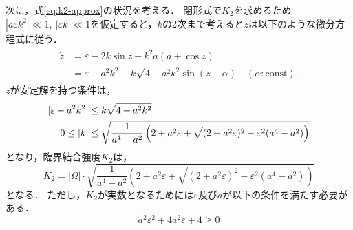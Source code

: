 \documentclass[../main]{subfiles}
\begin{document}
    次に，式\eqref{eq:k2-approx}の状況を考える．
    閉形式で$K_2$を求めるため$|a\varepsilon k^2| \ll 1,\ |\varepsilon k|\ll 1$を仮定すると，$k$の2次まで考えると$z$は以下のような微分方程式に従う．
    \begin{align}
        \label{eq:z-k2-approx}
        \begin{split}
            \dot{z}&=\varepsilon-2k\sin z-k^2a(a+\cos  z)\\
            &=\varepsilon-a^2k^2-k\sqrt{4+a^2k^2}\sin ( z-\alpha)\quad(\alpha:\mathrm{const}).
        \end{split}
    \end{align}
    $z$が安定解を持つ条件は，
    \begin{align}
        |\varepsilon-a^2k^2|&\leq k\sqrt{4+a^2k^2}\notag\\
        0\leq |k|&\leq \sqrt{\frac{1}{a^4-a^2}\left(2+a^2\varepsilon+\sqrt{(2+a^2\varepsilon)^2-\varepsilon^2(a^4-a^2)}\right)}
    \end{align}
    となり，臨界結合強度$K_2$は，
    \begin{equation}
        \label{eq:K2-approx}
        K_2=|\Omega|\cdot\sqrt{\frac{1}{a^4-a^2}\left(2+a^2\varepsilon+\sqrt{(2+a^2\varepsilon)^2-\varepsilon^2(a^4-a^2)}\right)}
    \end{equation}
    となる．
    ただし，$K_2$が実数となるためには$\varepsilon$及び$a$が以下の条件を満たす必要がある．
    \begin{equation}
        a^2\varepsilon^2+4a^2\varepsilon+4\geq 0
    \end{equation}
\end{document}
